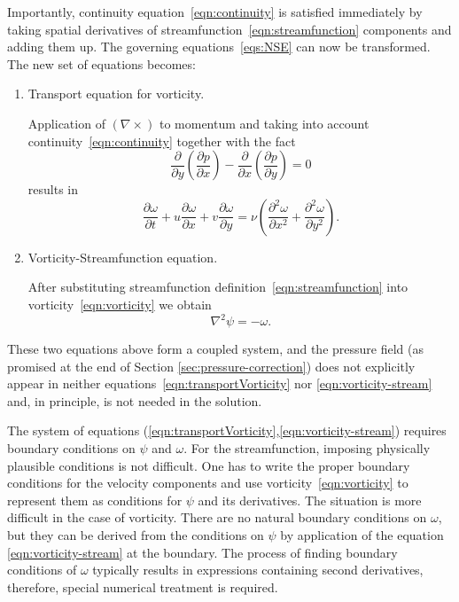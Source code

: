 \documentclass{article}
\begin{document}
	Importantly, continuity equation~\eqref{eqn:continuity} is satisfied immediately by taking spatial derivatives of streamfunction~\eqref{eqn:streamfunction} components and adding them up. The governing equations~\eqref{eqs:NSE} can now be transformed. The new set of equations becomes:
	\begin{enumerate}
		\item 
			Transport equation for vorticity.
			
			Application of $(\nabla \times)$ to momentum and taking into account continuity~\eqref{eqn:continuity} together with the fact
			\begin{equation*}
				\frac{\partial}{\partial y}\left(\frac{\partial p}{\partial x}\right) - 
				\frac{\partial}{\partial x}\left(\frac{\partial p}{\partial y}\right)=0
			\end{equation*}
			results in
			\begin{equation}
			\label{eqn:transportVorticity}
				\boxed{
				\frac{\partial\omega}{\partial t} 
				+ u \frac{\partial\omega}{\partial x} 
				+ v\frac{\partial\omega}{\partial y} 
				= \nu \left(\frac{\partial ^2 \omega}{\partial x^2} 
				+ \frac{\partial^2 \omega}{\partial y^2} \right).
				}
			\end{equation}
			
		\item 
		Vorticity-Streamfunction equation.
		
		After substituting streamfunction definition~\eqref{eqn:streamfunction} into vorticity~\eqref{eqn:vorticity} we obtain
		\begin{equation}
			\label{eqn:vorticity-stream}
			\boxed{\nabla ^2 \psi = -\omega.}
		\end{equation}	
	\end{enumerate}
	
	These two equations above form a coupled system, and the pressure field (as promised at the end of Section \ref{sec:pressure-correction}) does not explicitly appear in neither equations~\eqref{eqn:transportVorticity} nor \eqref{eqn:vorticity-stream} and, in principle, is not needed in the solution.
	
	The system of equations (\eqref{eqn:transportVorticity},\eqref{eqn:vorticity-stream}) requires boundary conditions on $\psi$ and $\omega$. For the streamfunction, imposing physically plausible conditions is not difficult. One has to write the proper boundary conditions for the velocity components and use vorticity~\eqref{eqn:vorticity} to represent them as conditions for $\psi$ and its derivatives. The situation is more difficult in the case of vorticity. There are no natural boundary conditions on $\omega$, but they can be derived from the conditions on $\psi$ by application of the equation \eqref{eqn:vorticity-stream} at the boundary. The process of finding boundary conditions of $\omega$ typically results in expressions containing second derivatives, therefore, special numerical treatment is required.
 
\end{document}
